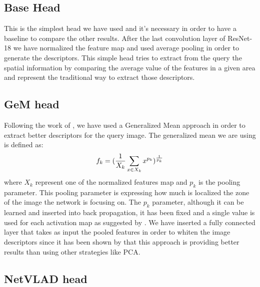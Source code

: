 \documentclass[10pt,twocolumn,letterpaper]{article}
\begin{document}
\subsection{Base Head}
This is the simplest head we have used and it's necessary in order to have a baseline to compare the other
results. After the last convolution layer of ResNet-18 we have normalized the feature map and used average 
pooling in order to generate the descriptors. This simple head tries to extract from the query the spatial
information by comparing the average value of the features in a given area and represent the traditional way 
to extract those descriptors.

\subsection{GeM head}
Following the work of \cite{GEM}, we have used a Generalized Mean approach in order to extract better 
descriptors for the query image. The generalized mean we are using is defined as:
\begin{equation}
   f_k = ({{1}\over{X_k}} \sum_{x \in X_k} x^{p_k} ) ^ {1\over{p_k}}
\end{equation}
where $X_k $ represent one of the normalized features map and $p_k $ is the pooling parameter. This 
pooling parameter is expressing how much is localized the zone of the image the network is focusing on.
The $p_k $ parameter, although it can be learned and inserted into back propagation, it has been fixed
and a single value is used for each activation map as suggested by \cite{GEM}. We have
inserted a fully connected layer that takes as input the pooled features in order to whiten the image
descriptors since it has been shown by \cite{GEM} that this approach is providing better results than
using other strategies like PCA.

\subsection{NetVLAD head}
\end{document}
